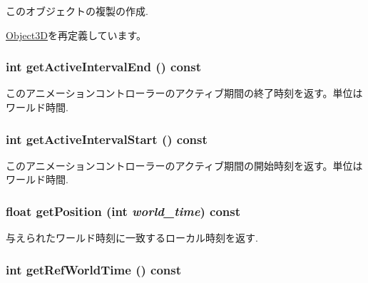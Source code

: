 このオブジェクトの複製の作成. 

\hyperlink{classm3g_1_1Object3D_a25110dac934f867b83b73ad4741a0f4}{Object3D}を再定義しています。\hypertarget{classm3g_1_1AnimationController_7caa95c7ed5a03844abe328feaae4911}{
\subsubsection[{getActiveIntervalEnd}]{\setlength{\rightskip}{0pt plus 5cm}int getActiveIntervalEnd () const}}
\label{classm3g_1_1AnimationController_7caa95c7ed5a03844abe328feaae4911}


このアニメーションコントローラーのアクティブ期間の終了時刻を返す。単位はワールド時間. \hypertarget{classm3g_1_1AnimationController_c66e837ae4152477eabdfcbe7fb21adb}{
\subsubsection[{getActiveIntervalStart}]{\setlength{\rightskip}{0pt plus 5cm}int getActiveIntervalStart () const}}
\label{classm3g_1_1AnimationController_c66e837ae4152477eabdfcbe7fb21adb}


このアニメーションコントローラーのアクティブ期間の開始時刻を返す。単位はワールド時間. \hypertarget{classm3g_1_1AnimationController_dfdea73153cb34c26979575efda149e2}{
\subsubsection[{getPosition}]{\setlength{\rightskip}{0pt plus 5cm}float getPosition (int {\em world\_\-time}) const}}
\label{classm3g_1_1AnimationController_dfdea73153cb34c26979575efda149e2}


与えられたワールド時刻に一致するローカル時刻を返す. \hypertarget{classm3g_1_1AnimationController_103e1bd81eba2cc90f31e7fdc4f3c601}{
\subsubsection[{getRefWorldTime}]{\setlength{\rightskip}{0pt plus 5cm}int getRefWorldTime () const}}
\label{classm3g_1_1AnimationController_103e1bd81eba2cc90f31e7fdc4f3c601}


